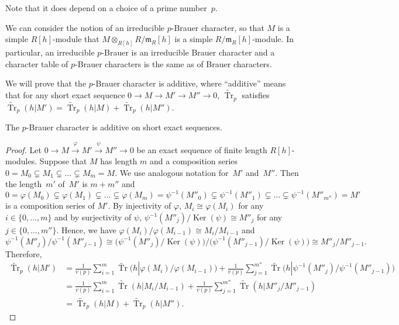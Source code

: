 Note that it does depend on a choice of a prime number~$p$.

We can consider the notion of an irreducible $p$-Brauer character, so that $M$ is a simple $R[h]$-module that $M\otimes_{R[h]} R/\mathfrak{m}_R[h]$ is a simple $R/\mathfrak{m}_R[h]$-module. In particular, an irreducible $p$-Brauer is an irreducible Brauer character and a character table of $p$-Brauer characters is the same as of Brauer characters.

We will prove that the $p$-Brauer character is additive, where ``additive'' means that for any short exact sequence $0\rightarrow M\rightarrow M'\rightarrow M''\rightarrow 0$, $\widetilde{\operatorname{Tr}}_p$ satisfies $\widetilde{\operatorname{Tr}}_p(h|M')=\widetilde{\operatorname{Tr}}_p(h|M)+\widetilde{\operatorname{Tr}}_p(h|M'')$.

\begin{Lemma}\label{additive}
The $p$-Brauer character is additive on short exact sequences.
\end{Lemma}

\begin{proof}
Let $0\rightarrow M\xrightarrow{\varphi} M'\xrightarrow{\psi} M''\rightarrow 0$ be an exact sequence of finite length $R[h]$-modules. Suppose that $M$ has length $m$ and a composition series $0=M_0\subsetneq M_1\subsetneq \dots \subsetneq M_m=M$. We use analogous notation for~$M'$ and~$M''$. Then the length~$m'$ of~$M'$ is $m+m''$ and
\[
0=\varphi(M_0)\subsetneq \varphi(M_1)\subsetneq \dots \subsetneq \varphi(M_m)=\psi^{-1}(M''_0)\subsetneq \psi^{-1}(M''_1)\subsetneq \dots \subsetneq \psi^{-1}(M''_{m''})=M'
\]
 is a composition series of $M'$. By injectivity of $\varphi$, $M_i\cong \varphi(M_i)$ for any $i \in \{0, \dots,m\}$ and by surjectivity of $\psi$, $\psi^{-1}(M''_j)/\operatorname{Ker}(\psi)\cong M''_j$ for any $j \in \{0, \dots,m''\}$. Hence, we have $\varphi(M_i)/\varphi(M_{i-1})\cong M_i/M_{i-1}$ and
\[
\psi^{-1}(M''_j)/\psi^{-1}(M''_{j-1})\cong \big(\psi^{-1}(M''_j)/\operatorname{Ker}(\psi)\big)/\big(\psi^{-1}(M''_{j-1})/\operatorname{Ker}(\psi)\big) \cong M''_j/M''_{j-1}.
\]
 Therefore,
\begin{align*}
\widetilde{\operatorname{Tr}}_p(h|M')&=\frac{1}{v(p)}\sum_{i=1}^m\widetilde{\operatorname{Tr}}\big(h|\varphi(M_i)/\varphi(M_{i-1})\big) +\frac{1}{v(p)}\sum_{j=1}^{m''}\widetilde{\operatorname{Tr}}\big(h|\psi^{-1}(M''_j)/\psi^{-1}(M''_{j-1})\big) \\
 &=\frac{1}{v(p)}\sum_{i=1}^m\widetilde{\operatorname{Tr}}(h|M_i/M_{i-1})+\frac{1}{v(p)}\sum_{j=1}^{m''}\widetilde{\operatorname{Tr}}(h|M''_j/M''_{j-1}) \\
 &=\widetilde{\operatorname{Tr}}_p(h|M)+\widetilde{\operatorname{Tr}}_p(h|M'').\tag*{\qed}
\end{align*}\renewcommand{\qed}{}
\end{proof}

